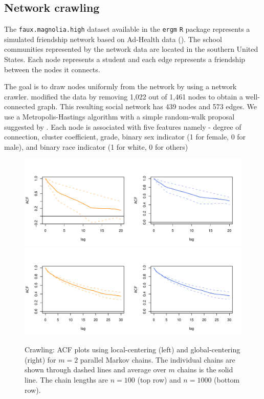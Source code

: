 \documentclass[11pt]{article}
\theoremstyle{remark}
\begin{document}
\subsection{Network crawling}


The \texttt{faux.magnolia.high} dataset available in the \texttt{ergm} \texttt{R} package represents a simulated friendship network based on Ad-Health data (\cite{resnick1997protecting}). The school communities represented by the network data are located in the southern United States. Each node represents a student and each edge represents a friendship between the nodes it connects.

The goal is to draw nodes uniformly from the network by using a network crawler. \cite{nilakanta2019ensuring} modified the data by removing 1,022 out of 1,461 nodes to obtain a well-connected graph. This resulting social network has 439 nodes and 573 edges. We use a Metropolis-Hastings algorithm with a simple random-walk  proposal suggested by \cite{gjoka2011practical}. Each node is associated with five features namely - degree of connection, cluster coefficient, grade, binary sex indicator (1 for female, 0 for male), and binary race indicator (1 for white, 0 for others)

\begin{figure}[htbp]
    \centering
      \includegraphics[width = .6\textwidth]{plots/magnolia-acf_n100.pdf}\\ \vspace{-.5cm}
      \includegraphics[width = .6\textwidth]{plots/magnolia-acf_n1000.pdf}

    \caption{Crawling:  ACF plots using local-centering (left) and global-centering (right) for $m=2$ parallel Markov chains. The individual chains are shown through dashed lines and average over $m$ chains is the solid line. The chain lengths are $n = 100$ (top row) and $n = 1000$ (bottom row).}
    \label{fig:magnolia-acf}
\end{figure}
\end{document}
